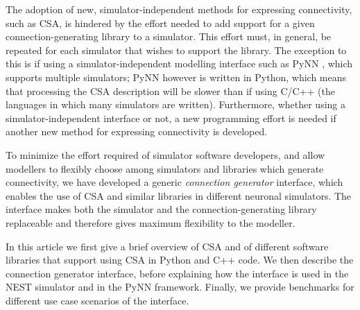 \documentclass{frontiersSCNS} %
\begin{document}
The adoption of new, simulator-independent methods for expressing
connectivity, such as CSA, is hindered by the effort needed to add
support for a given connection-generating library to a simulator.
This effort must, in general, be repeated for each simulator that
wishes to support the library.  The exception to this is if using a
simulator-independent modelling interface such as PyNN
\citep[\url{http://www.neuralensemble.org/PyNN};][]{Davison09}, which
supports multiple simulators; PyNN however is written in Python, which
means that processing the CSA description will be slower than if using
C/C++ (the languages in which many simulators are written).
Furthermore, whether using a simulator-independent interface or not, a
new programming effort is needed if another new method for expressing
connectivity is developed.

To minimize the effort required of simulator software developers, and
allow modellers to flexibly choose among simulators and libraries
which generate connectivity, we have developed a generic
\emph{connection generator} interface, which enables the use of CSA
and similar libraries in different neuronal simulators.  The interface
makes both the simulator and the connection-generating library
replaceable and therefore gives maximum flexibility to the modeller.

In this article we first give a brief overview of CSA and of different
software libraries that support using CSA in Python and C++ code.  We
then describe the connection generator interface, before explaining
how the interface is used in the NEST simulator
\citep[\url{http://www.nest-initiative.org};][]{Gewaltig_07_11204} and
in the PyNN framework.  Finally, we provide benchmarks for different
use case scenarios of the interface.
\end{document}
